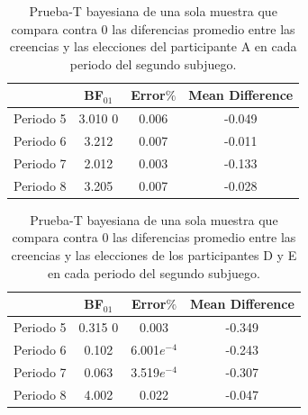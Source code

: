 \begin{table}
\caption[Diferencias Normalizadas en el Subjuego 2 (Participantes A)]{Prueba-T bayesiana de una sola muestra que compara contra 0 las diferencias promedio entre las creencias y las elecciones del participante A en cada periodo del segundo subjuego.}
\label{DN_Sub2_A}
\centering
\begin{tabular}{l | c c c}  %
\toprule
\textbf{} & \textbf{BF$_{01}$} & \textbf{Error$\%$} & \textbf{Mean Difference}\\
\midrule
Periodo 5 & 3.010 0& 0.006 & -0.049 \\
Periodo 6 & 3.212 & 0.007 & -0.011 \\
Periodo 7 & 2.012 & 0.003 & -0.133 \\
Periodo 8 & 3.205 & 0.007 & -0.028 \\
\bottomrule
\end{tabular}
\end{table}

\begin{table}
\caption[Diferencias Normalizadas en el Subjuego 2 (Participantes D y E)]{Prueba-T bayesiana de una sola muestra que compara contra 0 las diferencias promedio entre las creencias y las elecciones de los participantes D y E en cada periodo del segundo subjuego.}
\label{DN_Sub2_DE}
\centering
\begin{tabular}{l | c c c}  %
\toprule
\textbf{} & \textbf{BF$_{01}$} & \textbf{Error$\%$} & \textbf{Mean Difference}\\
\midrule
Periodo 5 & 0.315 0& 0.003 & -0.349 \\
Periodo 6 & 0.102 & 6.001$e^{-4}$ & -0.243 \\
Periodo 7 & 0.063 & 3.519$e^{-4}$ & -0.307 \\
Periodo 8 & 4.002 & 0.022 & -0.047 \\
\bottomrule
\end{tabular}
\end{table}

